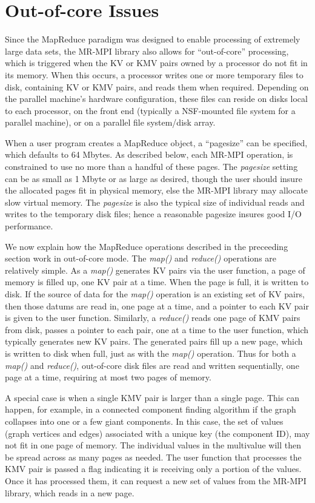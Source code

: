 \section{Out-of-core Issues}
\label{sec:outcore}

Since the MapReduce paradigm was designed to enable processing of
extremely large data sets, the MR-MPI library also allows for
``out-of-core'' processing, which is triggered when the KV or KMV
pairs owned by a processor do not fit in its memory.  When this
occurs, a processor writes one or more temporary files to disk,
containing KV or KMV pairs, and reads them when required.  Depending
on the parallel machine's hardware configuration, these files can
reside on disks local to each processor, on the front end (typically a
NSF-mounted file system for a parallel machine), or on a parallel file
system/disk array.

When a user program creates a MapReduce object, a ``pagesize'' can be
specified, which defaults to 64 Mbytes.  As described below, each
MR-MPI operation, is constrained to use no more than a handful of
these pages.  The {\it pagesize} setting can be as small as 1 Mbyte or
as large as desired, though the user should insure the allocated pages
fit in physical memory, else the MR-MPI library may allocate slow
virtual memory.  The {\it pagesize} is also the typical size of
individual reads and writes to the temporary disk files; hence a
reasonable pagesize insures good I/O performance.

We now explain how the MapReduce operations described in the
preceeding section work in out-of-core mode.  The {\it map()} and {\it
reduce()} operations are relatively simple.  As a {\it map()}
generates KV pairs via the user function, a page of memory is filled
up, one KV pair at a time.  When the page is full, it is written to
disk.  If the source of data for the {\it map()} operation is an
existing set of KV pairs, then those datums are read in, one page at a
time, and a pointer to each KV pair is given to the user function.
Similarly, a {\it reduce()} reads one page of KMV pairs from disk,
passes a pointer to each pair, one at a time to the user function,
which typically generates new KV pairs.  The generated pairs fill up a
new page, which is written to disk when full, just as with the {\it
map()} operation.  Thus for both a {\it map()} and {\it reduce()},
out-of-core disk files are read and written sequentially, one page at
a time, requiring at most two pages of memory.

A special case is when a single KMV pair is larger than a single page.
This can happen, for example, in a connected component finding
algorithm if the graph collapses into one or a few giant components.
In this case, the set of values (graph vertices and edges) associated
with a unique key (the component ID), may not fit in one page of
memory.  The individual values in the multivalue will then be spread
across as many pages as needed.  The user function that processes the
KMV pair is passed a flag indicating it is receiving only a portion of
the values.  Once it has processed them, it can request a new set of
values from the MR-MPI library, which reads in a new page.

